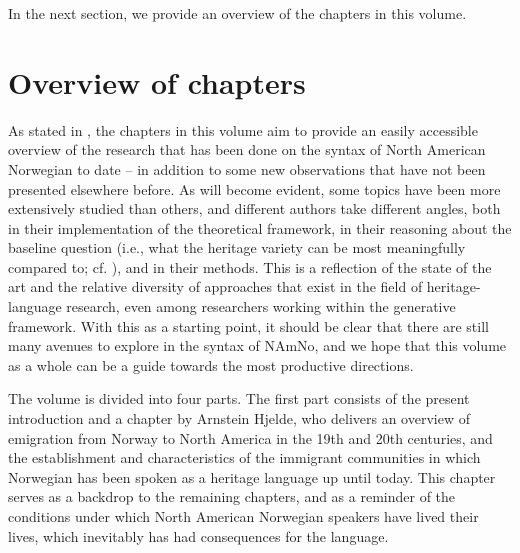 \documentclass[output=paper,colorlinks,citecolor=brown]{langscibook}
\begin{document}
In the next section, we provide an overview of the chapters in this volume. 


\section{Overview of chapters} \label{overview}
As stated in , the chapters in this volume aim to provide an easily accessible overview of the research that has been done on the syntax of North American Norwegian to date -- in addition to some new observations that have not been presented elsewhere before.  As will become evident, some topics have been more extensively studied than others, and  different authors take different angles, both in their implementation of the theoretical framework, in their reasoning about the baseline question (i.e., what the heritage variety can be most meaningfully compared to; cf. ), and in their methods. This is a reflection of the state of the art and  the relative diversity of approaches that exist in the field of heritage-language research, even among researchers working within the generative framework. With this as a starting point, it should be clear that there are still many avenues to explore in the syntax of NAmNo, and we hope that this volume as a whole can be a guide towards the most productive directions. 

The volume is divided into four parts. The first part consists of the present introduction and a chapter by Arnstein Hjelde, who delivers an overview of emigration from Norway to North America in the 19th and 20th centuries, and the establishment and characteristics of the immigrant communities in which Norwegian has been spoken as a heritage language up until today. This chapter serves as a backdrop to the remaining chapters, and as a reminder of the  conditions under which North American Norwegian speakers have lived their lives, which inevitably has had consequences for the language. 
\end{document}
